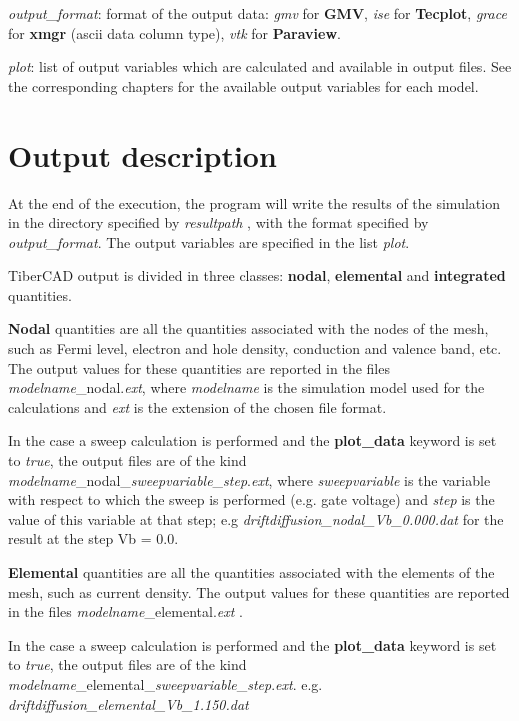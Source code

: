 \textit{output\_format}: format of  the  output data: \textit{gmv} for  \textbf{GMV},  \textit{ise}  for  \textbf{Tecplot}, \textit{grace} for \textbf{xmgr} (ascii data column type),  \textit{vtk} for  \textbf{Paraview}.

\textit{plot}:  list of output variables which are calculated and available in output  files. See the  corresponding chapters for the  available output variables for each model.

\section{Output description}


At the end of  the  execution, the  program will  write  the  results of  the  simulation  in the  directory specified by \textit{resultpath} , with the  format  specified by \textit{output\_format}.  The  output  variables  are specified in  the  list  \textit{plot}.

TiberCAD  output is  divided in  three  classes: \textbf{nodal}, \textbf{elemental} and  \textbf{integrated}  quantities.

\textbf{Nodal}  quantities are all  the  quantities associated with the nodes of  the  mesh,  such as  Fermi level,  electron and  hole  density,  conduction and  valence band, etc.  The output  values for  these  quantities are reported in  the  files  \textit{modelname}\_nodal.\textit{ext},  where  \textit{modelname} is  the simulation model used for the  calculations and  \textit{ext} is  the  extension of  the  chosen  file  format. 

In the  case  a  sweep  calculation is  performed and  the  \textbf{plot\_data} keyword is  set  to  \textit{true}, the output files  are of  the  kind \textit{modelname}\_nodal\_\textit{sweepvariable}\_\textit{step}.\textit{ext}, where  \textit{sweepvariable} is  the  variable with respect to  which the  sweep is  performed (e.g. gate voltage) and  \textit{step} is  the  value of  this  variable  at that step;  e.g  \textit{driftdiffusion\_nodal\_Vb\_0.000.dat} for the  result at the step Vb = 0.0.

\textbf{Elemental}  quantities are all  the  quantities associated with the elements of  the  mesh,  such as  current density.
The output  values for  these  quantities are reported in  the  files  \textit{modelname}\_elemental.\textit{ext} .

In the  case  a  sweep  calculation is  performed and  the  \textbf{plot\_data} keyword is  set  to  \textit{true},
 the output files  are of  the  kind \textit{modelname}\_elemental\_\textit{sweepvariable}\_\textit{step}.\textit{ext}.
e.g. \textit{driftdiffusion\_elemental\_Vb\_1.150.dat}

